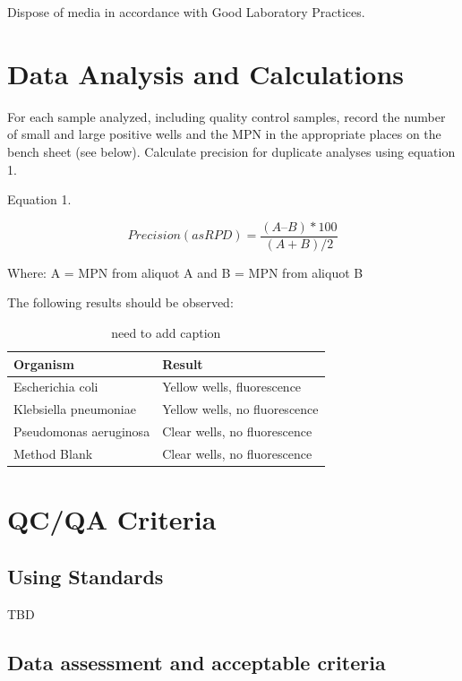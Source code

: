 \documentclass[12pt]{../SOP4_alpha}\usepackage[]{graphicx}\usepackage[]{xcolor}
\begin{document}
\NP Dispose of media in accordance with Good Laboratory Practices.

\section{Data Analysis and Calculations}

\NP For each sample analyzed, including quality control samples, record
the number of small and large positive wells and the MPN in the
appropriate places on the bench sheet (see below). Calculate
precision for duplicate analyses using equation 1.

\NP Equation 1. 

\begin{equation}
Precision (as RPD) = \frac{(A – B)*100}{(A + B)/2}
\end{equation}

Where: A = MPN from aliquot A and
 B = MPN from aliquot B 

\NP The following results should be observed:


\begin{table}
\caption{need to add caption}
		\begin{tabular}{ll}\hline

Organism                &  Result \\ \hline \hline
Escherichia coli        & Yellow wells, fluorescence \\
Klebsiella pneumoniae   & Yellow wells, no fluorescence \\
Pseudomonas aeruginosa  & Clear wells, no fluorescence \\
Method Blank            & Clear wells, no fluorescence \\ \hline
  \end{tabular}
\end{table}


\section{QC/QA Criteria}

\subsection{Using Standards}

\NP TBD

\subsection{Data assessment and acceptable criteria}
\end{document}
